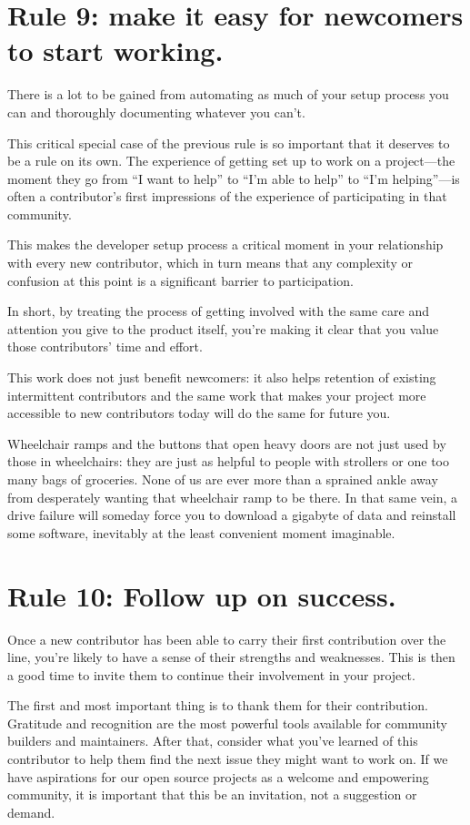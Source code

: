 \documentclass[10pt,letterpaper]{article}
\newcommand{\rulemajor}[1]{\section*{#1}}
\begin{document}
\rulemajor{Rule 9: make it easy for newcomers to start working.}

There is a lot to be gained from automating as much of your setup process you can
and thoroughly documenting whatever you can't. 

This critical special case of the previous rule is so important that it deserves to be a rule on its own.
The experience of getting set up to work on a project---the moment they go from ``I want to help''
to ``I'm able to help'' to ``I'm helping''---is often a contributor's first impressions of 
the experience of participating in that community.

This makes the developer setup process a critical moment in your relationship with every new contributor,
which in turn means that any complexity or confusion at this point is a significant barrier to participation.

In short, by treating the process of getting involved with the same care and attention you give
to the product itself, you're making it clear that you value those contributors' time and effort.

This work does not just benefit newcomers:
it also helps retention of existing intermittent contributors and the same work that makes your project more
accessible to new contributors today will do the same for future you.

Wheelchair ramps and the buttons that open heavy doors are not just used by those in wheelchairs:
they are just as helpful to people with strollers or one too many bags of groceries.
None of us are ever more than a sprained ankle away from desperately wanting that wheelchair ramp to be there.
In that same vein, a drive failure will someday force you to download a gigabyte of data
and reinstall some software, inevitably at the least convenient moment imaginable. 

\rulemajor{Rule 10: Follow up on success.}

Once a new contributor has been able to carry their first contribution over the line, 
you're likely to have a sense of their strengths and weaknesses.
This is then a good time to invite them to continue their involvement in your project.

The first and most important thing is to thank them for their contribution.
Gratitude and recognition are the most powerful tools available for community builders and maintainers. 
After that,
consider what you've learned of this contributor to help them find
the next issue they might want to work on.
If we have aspirations for our open source projects as a welcome and empowering community,
it is important that this be an invitation,
not a suggestion or demand. 


\end{document}
